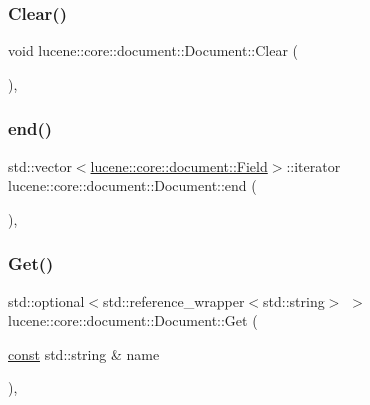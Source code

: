 \subsubsection{\texorpdfstring{Clear()}{Clear()}}
{\footnotesize\ttfamily void lucene\+::core\+::document\+::\+Document\+::\+Clear (\begin{DoxyParamCaption}{ }\end{DoxyParamCaption})\hspace{0.3cm}{\ttfamily [inline]}, {\ttfamily [noexcept]}}

\mbox{\label{classlucene_1_1core_1_1document_1_1Document_ad0a1cb1cadecb670e770ee744a48a619}} 
\subsubsection{\texorpdfstring{end()}{end()}}
{\footnotesize\ttfamily std\+::vector$<$\mbox{\hyperlink{classlucene_1_1core_1_1document_1_1Field}{lucene\+::core\+::document\+::\+Field}}$>$\+::iterator lucene\+::core\+::document\+::\+Document\+::end (\begin{DoxyParamCaption}{ }\end{DoxyParamCaption})\hspace{0.3cm}{\ttfamily [inline]}, {\ttfamily [noexcept]}}

\mbox{\label{classlucene_1_1core_1_1document_1_1Document_aaa33b6b731feba963643568e9df77dfc}} 
\subsubsection{\texorpdfstring{Get()}{Get()}}
{\footnotesize\ttfamily std\+::optional$<$std\+::reference\+\_\+wrapper$<$std\+::string$>$ $>$ lucene\+::core\+::document\+::\+Document\+::\+Get (\begin{DoxyParamCaption}\item[{\mbox{\hyperlink{ZlibCrc32_8h_a2c212835823e3c54a8ab6d95c652660e}{const}} std\+::string \&}]{name }\end{DoxyParamCaption})\hspace{0.3cm}{\ttfamily [inline]}, {\ttfamily [noexcept]}}

